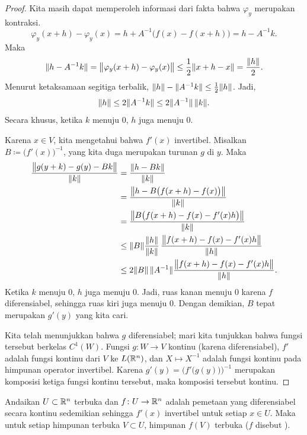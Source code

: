\begin{proof}
Kita masih dapat
memperoleh informasi dari fakta bahwa $\varphi_y$ merupakan kontraksi.
\begin{equation*}
\varphi_y(x+h)-\varphi_y(x) = h + A^{-1} \bigl( f(x)-f(x+h) \bigr) = h - A^{-1} k .
\end{equation*}
Maka
\begin{equation*}
\lVert {h-A^{-1}k} \rVert = \bigl\lVert {\varphi_y(x+h)-\varphi_y(x)} \bigr\rVert \leq
\frac{1}{2}\lVert {x+h-x} \rVert = \frac{\lVert {h} \rVert}{2}.
\end{equation*}
Menurut ketaksamaan segitiga terbalik, $\lVert {h} \rVert - \lVert {A^{-1}k} \rVert \leq
\frac{1}{2}\lVert {h} \rVert$.
Jadi,
\begin{equation*}
\lVert {h} \rVert \leq 2 \lVert {A^{-1}k} \rVert \leq 2 \lVert {A^{-1}} \rVert \, \lVert {k} \rVert.
\end{equation*}
Secara khusus, ketika $k$ menuju 0, $h$ juga menuju 0.

Karena $x \in V$, kita mengetahui bahwa $f'(x)$ invertibel.
Misalkan $B \coloneqq \bigl(f'(x)\bigr)^{-1}$, yang kita duga merupakan turunan
$g$ di $y$.  Maka
\begin{equation*}
\begin{split}
\frac{\bigl\lVert {g(y+k)-g(y)-Bk} \bigr\rVert}{\lVert {k} \rVert}
& =
\frac{\lVert {h-Bk} \rVert}{\lVert {k} \rVert}
\\
& =
\frac{\bigl\lVert {h-B\bigl(f(x+h)-f(x)\bigr)} \bigr\rVert}{\lVert {k} \rVert}
\\
& =
\frac{\bigl\lVert {B\bigl(f(x+h)-f(x)-f'(x)h\bigr)} \bigr\rVert}{\lVert {k} \rVert}
\\
& \leq
\lVert {B} \rVert
\frac{\lVert {h} \rVert}{\lVert {k} \rVert}\,
\frac{\bigl\lVert {f(x+h)-f(x)-f'(x)h} \bigr\rVert}{\lVert {h} \rVert}
\\
& \leq
2\lVert {B} \rVert \, \lVert {A^{-1}} \rVert
\frac{\bigl\lVert {f(x+h)-f(x)-f'(x)h} \bigr\rVert}{\lVert {h} \rVert} .
\end{split}
\end{equation*}
Ketika $k$ menuju 0, $h$ juga menuju 0.  Jadi, ruas kanan menuju 0 karena $f$
diferensiabel, sehingga
ruas kiri juga menuju 0.  Dengan demikian,
$B$ tepat merupakan $g'(y)$ yang kita cari.

Kita telah menunjukkan bahwa $g$ diferensiabel; mari kita tunjukkan bahwa fungsi tersebut berkelas $C^1(W)$.
Fungsi $g \colon W \to V$ kontinu (karena diferensiabel),
$f'$ adalah fungsi kontinu dari $V$
ke $L({\mathbb{R}}^n)$, dan $X \mapsto X^{-1}$ adalah fungsi kontinu pada
himpunan operator invertibel.
Karena
$g'(y) = {\bigl( f'\bigl(g(y)\bigr)\bigr)}^{-1}$ merupakan komposisi
ketiga fungsi
kontinu tersebut, maka komposisi tersebut kontinu.
\end{proof}

\begin{cor} \label{cor:IVTopenmap}
Andaikan $U \subset {\mathbb{R}}^n$ terbuka dan $f \colon U \to {\mathbb{R}}^n$ adalah pemetaan yang
diferensiabel secara kontinu sedemikian sehingga $f'(x)$ invertibel untuk setiap $x \in U$.  Maka
untuk setiap himpunan terbuka $V \subset U$, himpunan $f(V)$ terbuka ($f$ disebut
\emph{}).
\end{cor}

